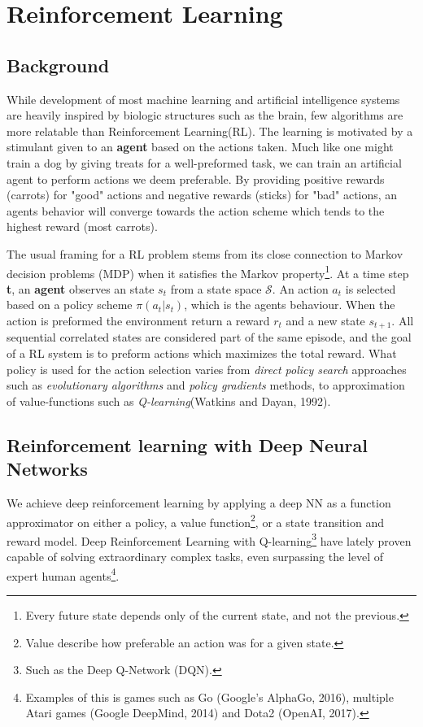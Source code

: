 \documentclass[a4paper,english]{report}
\begin{document}
\chapter{Reinforcement Learning}
\section{Background}\label{rlbackground}
While development of most machine learning and artificial intelligence systems are heavily inspired by biologic structures such as the brain, few algorithms are more relatable than Reinforcement Learning(RL). The learning is motivated by a stimulant given to an \textbf{agent} based on the actions taken. Much like one might train a dog by giving treats for a well-preformed task, we can train an artificial agent to perform actions we deem preferable. By providing positive rewards (carrots) for "good" actions and negative rewards (sticks) for "bad" actions, an agents behavior will converge towards the action scheme which tends to the highest reward (most carrots). 

The usual framing for a RL problem stems from its close connection to Markov decision problems (MDP) when it satisfies the Markov property\footnote{Every future state depends only of the current state, and not the previous.}. At a time step \textbf{t}, an \textbf{agent} observes an state \(s_t\) from a state space \(\mathcal{S}\). An action \(a_t\) is selected based on a policy scheme \(\pi(a_t|s_t)\), which is the agents behaviour. When the action is preformed the environment return a reward \(r_t\) and a new state \(s_{t+1}\). All sequential correlated states are considered part of the same episode, and the goal of a RL system is to preform actions which maximizes the total reward. What policy is used for the action selection varies from \textit{direct policy search} approaches such as \textit{evolutionary algorithms} and \textit{policy gradients} methods\cite{policygradient}, to approximation of value-functions such as \textit{Q-learning}(Watkins and Dayan, 1992).


\section{Reinforcement learning with Deep Neural Networks}
We achieve deep reinforcement learning by applying a deep NN as a function approximator on either a policy, a value function\footnote{Value describe how preferable an action was for a given state.}, or a state transition and reward model. Deep Reinforcement Learning with Q-learning\footnote{Such as the Deep Q-Network (DQN).} have lately proven capable of solving extraordinary complex tasks, even surpassing the level of expert human agents\footnote{Examples of this is games such as Go (Google’s AlphaGo\cite{alphago}, 2016), multiple Atari games (Google DeepMind\cite{DeepMindAtari}, 2014) and Dota2 (OpenAI\cite{dota2}, 2017).}. 
\end{document}
